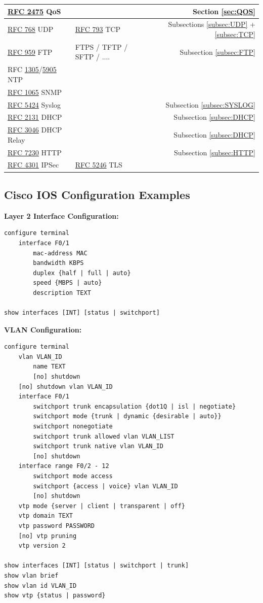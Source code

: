 \documentclass[12pt]{article}
\newcommand{\rfc}[1]{\href{https://datatracker.ietf.org/doc/html/rfc#1}{#1}}
\newcommand{\RFC}[1]{\href{https://datatracker.ietf.org/doc/html/rfc#1}{RFC #1}}
\begin{document}
\begin{table}[H]
\begin{tabular}{llr}
	\RFC{2475} QoS			&					& Section \ref{sec:QOS}\\\hline
	\RFC{768} UDP			& \RFC{793} TCP			& Subsections \ref{subsec:UDP} + \ref{subsec:TCP}\\\hline
	\RFC{959} FTP			& FTPS / TFTP / SFTP / ....	& Subsection \ref{subsec:FTP}\\
	RFC \rfc{1305}/\rfc{5905} NTP	&					&\\
	\RFC{1065} SNMP			&					&\\
	\RFC{5424} Syslog			&					& Subsection \ref{subsec:SYSLOG}\\
	\RFC{2131} DHCP			&					& Subsection \ref{subsec:DHCP}\\
	\RFC{3046} DHCP Relay		&					& Subsection \ref{subsec:DHCP}\\
	\RFC{7230} HTTP			&					& Subsection \ref{subsec:HTTP}\\
	\RFC{4301} IPSec			& \RFC{5246} TLS			&\\\hline
	\end{tabular}\end{table}


	\newpage
	\subsection{Cisco IOS Configuration Examples \label{subsec:CONFIG}}
	\textbf{Layer 2 Interface Configuration:}
	\begin{lstlisting}
configure terminal
	interface F0/1
		mac-address MAC
		bandwidth KBPS
		duplex {half | full | auto}
		speed {MBPS | auto}
		description TEXT

show interfaces [INT] [status | switchport]
	\end{lstlisting}

	\textbf{VLAN Configuration:}
	\begin{lstlisting}
configure terminal
	vlan VLAN_ID
		name TEXT
		[no] shutdown
	[no] shutdown vlan VLAN_ID
	interface F0/1
		switchport trunk encapsulation {dot1Q | isl | negotiate}
		switchport mode {trunk | dynamic {desirable | auto}}
		switchport nonegotiate
		switchport trunk allowed vlan VLAN_LIST
		switchport trunk native vlan VLAN_ID
		[no] shutdown
	interface range F0/2 - 12
		switchport mode access
		switchport {access | voice} vlan VLAN_ID
		[no] shutdown
	vtp mode {server | client | transparent | off}
	vtp domain TEXT
	vtp password PASSWORD
	[no] vtp pruning
	vtp version 2

show interfaces [INT] [status | switchport | trunk]
show vlan brief
show vlan id VLAN_ID
show vtp {status | password}
	\end{lstlisting}
\end{document}
